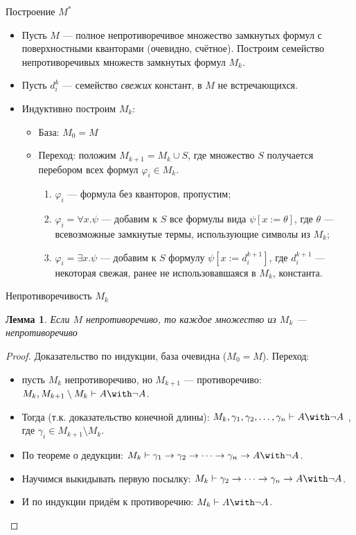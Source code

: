 \documentclass[aspectratio=169]{beamer}
\newtheorem{lmm}{Лемма}[section]
\begin{document}
\begin{frame}{Построение $M^*$}
\begin{itemize}
\item Пусть $M$ --- полное непротиворечивое множество замкнутых формул с поверхностными кванторами (очевидно, счётное). \pause
 Построим семейство непротиворечивых множеств замкнутых формул $M_k$.\pause
\item Пусть $d^k_i$ --- семейство \emph{свежих} констант, в $M$ не встречающихся.\pause
\item Индуктивно построим $M_k$:
\begin{itemize}
\item База: $M_0 = M$\pause
\item Переход: положим $M_{k+1} = M_k \cup S$, где множество $S$ получается перебором всех формул $\varphi_i \in M_k$.\pause
\begin{enumerate}
\item $\varphi_i$ --- формула без кванторов, пропустим;\pause
\item $\varphi_i = \forall x.\psi$ --- добавим к $S$ все формулы вида $\psi [x := \theta]$, где
$\theta$ --- всевозможные замкнутые термы, использующие символы из $M_k$;\pause
\item $\varphi_i = \exists x.\psi$ --- добавим к $S$ формулу $\psi [x := d^{k+1}_i]$, где $d^{k+1}_i$ --- некоторая
свежая, ранее не использовавшаяся в $M_k$, константа.\pause
\end{enumerate}
\end{itemize}
\end{itemize}
\end{frame}

\begin{frame}{Непротиворечивость $M_k$}
\begin{lmm}Если $M$ непротиворечиво, то каждое множество из $M_k$ --- непротиворечиво\end{lmm}
\begin{proof}Доказательство по индукции, база очевидна ($M_0 = M$). \pause
Переход: \begin{itemize}
\item пусть $M_k$ непротиворечиво, но $M_{k+1}$ --- противоречиво: $M_k, M_{k+1}\setminus M_k \vdash A\with\neg A$. \pause
\item Тогда (т.к. доказательство конечной длины):
$M_k, \gamma_1, \gamma_2, \dots,\gamma_n\vdash A\with\neg A$
, где $\gamma_i \in M_{k+1}\setminus M_k$. \pause
\item По теореме о дедукции: $M_k\vdash \gamma_1\to\gamma_2\to\dots\to\gamma_n\to A\with\neg A$. \pause
\item Научимся выкидывать первую посылку: $M_k\vdash \gamma_2\to\dots\to\gamma_n\to A\with\neg A$. \pause
\item И по индукции придём к противоречию: $M_k \vdash A\with\neg A$.
\end{itemize}

\end{proof}
\end{frame}
\end{document}
